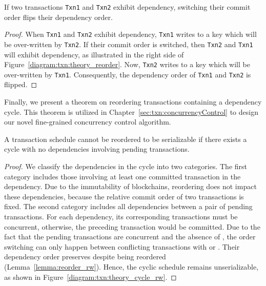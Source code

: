 \begin{lemma} 
  \label{lemma:reorder_ww}
  If two transactions \texttt{Txn1} and \texttt{Txn2} exhibit 
  dependency, switching their commit order flips their dependency order.
\end{lemma}

\begin{proof}
  When \texttt{Txn1} and \texttt{Txn2} exhibit  dependency,
  \texttt{Txn1} writes to a key which will be over-written by \texttt{Txn2}.
  If their commit order is switched, then \texttt{Txn2} and \texttt{Txn1} will
  exhibit  dependency, as illustrated in the right side of
  Figure~\ref{diagram:txn:theory_reorder}.
  Now, \texttt{Txn2} writes to a key which will be over-written by \texttt{Txn1}.
  Consequently, the dependency order of \texttt{Txn1} and \texttt{Txn2} is flipped.
\end{proof}

Finally, we present a theorem on reordering transactions containing a dependency
cycle. This theorem is utilized in Chapter~\ref{sec:txn:concurrencyControl} to
design our novel fine-grained concurrency control algorithm.

\begin{theorem}
  \label{theory:unreorderable}
  A transaction schedule cannot be reordered to be
  serializable if there exists a cycle with no  dependencies involving pending transactions.
\end{theorem}

\begin{proof}
  We classify the dependencies in the cycle into two categories. 
  The first category includes those involving at least one committed transaction in the dependency. 
  Due to the immutability of blockchains, reordering does not impact these dependencies, because the relative commit order of two transactions is fixed.
  The second category includes all dependencies between a pair of pending transactions. 
  For each dependency, its corresponding transactions must be concurrent, otherwise, the preceding transaction would be committed. 
  Due to the fact that the pending transactions are concurrent and the absence of , the order switching can only happen between conflicting transactions with  or .
  Their dependency order preserves despite being reordered (Lemma~\ref{lemma:reorder_rw}).
  Hence, the cyclic schedule remains unserializable, as shown in
  Figure~\ref{diagram:txn:theory_cycle_rw}.
\end{proof}

